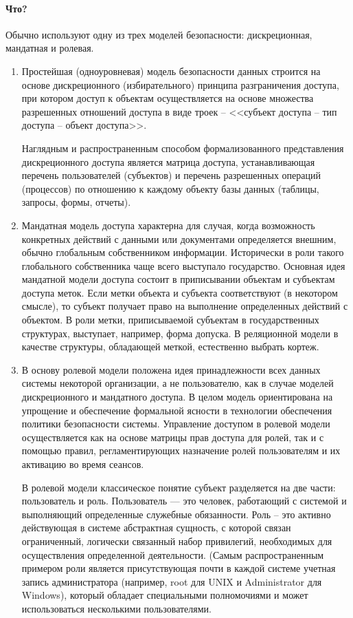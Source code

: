 \paragraph{Что?}
Обычно используют одну из трех моделей безопасности: дискреционная, мандатная и ролевая.
\begin{enumerate}
	\item Простейшая (одноуровневая) модель безопасности данных строится на основе дискреционного (избирательного) принципа разграничения доступа, при котором доступ к объектам осуществляется на основе множества разрешенных отношений доступа в виде троек -- <<субъект доступа -- тип доступа -- объект доступа>>.

	Наглядным и распространенным способом формализованного представления дискреционного доступа является матрица доступа, устанавливающая перечень пользователей (субъектов) и перечень разрешенных операций (процессов) по отношению к каждому объекту базы данных (таблицы, запросы, формы, отчеты).

	\item Мандатная модель доступа характерна для случая, когда возможность конкретных действий с данными или документами определяется внешним, обычно глобальным собственником информации. Исторически в роли такого глобального собственника чаще всего выступало государство. Основная идея мандатной модели доступа состоит в приписывании объектам и субъектам доступа меток. Если метки объекта и субъекта соответствуют (в некотором смысле), то субъект получает право на выполнение определенных действий с объектом. В роли метки, приписываемой субъектам в государственных структурах, выступает, например, форма допуска. В реляционной модели в качестве структуры, обладающей меткой, естественно выбрать кортеж.

	\item В основу ролевой модели положена идея принадлежности всех данных системы некоторой организации, а не пользователю, как в случае моделей дискреционного и мандатного доступа. В целом модель ориентирована на упрощение и обеспечение формальной ясности в технологии обеспечения политики безопасности системы. Управление доступом в ролевой модели осуществляется как на основе матрицы прав доступа для ролей, так и с помощью правил, регламентирующих назначение ролей пользователям и их
	активацию во время сеансов.

	В ролевой модели классическое понятие субъект разделяется на две части: пользователь и роль. Пользователь — это человек, работающий с системой и выполняющий определенные служебные обязанности. Роль -- это активно действующая в системе абстрактная сущность, с которой связан ограниченный, логически связанный набор привилегий, необходимых для осуществления определенной деятельности. (Самым распространенным примером роли явля­ется присутствующая почти в каждой системе учетная запись администратора (например, root для UNIX и Administrator для Windows), который обладает специальными полномочиями и может использоваться несколькими пользователями.


\end{enumerate}
